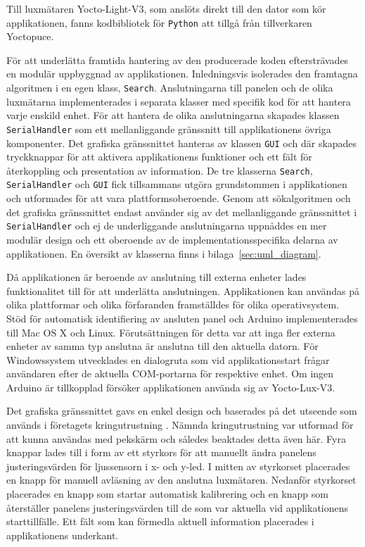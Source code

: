             Till luxmätaren Yocto-Light-V3, som anslöts direkt till den dator som kör applikationen, fanns kodbibliotek för \texttt{Python} att tillgå från tillverkaren Yoctopuce. \bigskip

            För att underlätta framtida hantering av den producerade koden eftersträvades en modulär uppbyggnad av applikationen. Inledningsvis isolerades den framtagna algoritmen i en egen klass, \texttt{Search}. Anslutningarna till panelen och de olika luxmätarna implementerades i separata klasser med specifik kod för att hantera varje enskild enhet. För att hantera de olika anslutningarna skapades klassen \texttt{SerialHandler} som ett mellanliggande gränssnitt till applikationens övriga komponenter. Det grafiska gränssnittet hanteras av klassen \texttt{GUI} och där skapades tryckknappar för att aktivera applikationens funktioner och ett fält för återkoppling och presentation av information. De tre klasserna \texttt{Search}, \texttt{SerialHandler} och \texttt{GUI} fick tillsammans utgöra grundstommen i applikationen och utformades för att vara plattformsoberoende. Genom att sökalgoritmen och det grafiska gränssnittet endast använder sig av det mellanliggande gränssnittet i \texttt{SerialHandler} och ej de underliggande anslutningarna uppnåddes en mer modulär design och ett oberoende av de implementationsspecifika delarna av applikationen. En översikt av klasserna finns i bilaga~\ref{sec:uml_diagram}. \bigskip

            Då applikationen är beroende av anslutning till externa enheter lades funktionalitet till för att underlätta anslutningen. Applikationen kan användas på olika plattformar och olika förfaranden framställdes för olika operativsystem. Stöd för automatisk identifiering av ansluten panel och Arduino implementerades till Mac OS X och Linux. Förutsättningen för detta var att inga fler externa enheter av samma typ anslutna är anslutna till den aktuella datorn. För Windowssystem utvecklades en dialogruta som vid applikationsstart frågar användaren efter de aktuella COM-portarna för respektive enhet. Om ingen Arduino är tillkopplad försöker applikationen använda sig av Yocto-Lux-V3. \bigskip

            Det grafiska gränssnittet gavs en enkel design och baserades på det utseende som används i företagets kringutrustning \cite{solarremote}. Nämnda kringutrustning var utformad för att kunna användas med pekskärm och således beaktades detta även här. Fyra knappar lades till i form av ett styrkors för att manuellt ändra panelens justeringsvärden för ljussensorn i x- och y-led. I mitten av styrkorset placerades en knapp för manuell avläsning av den anslutna luxmätaren. Nedanför styrkorset placerades en knapp som startar automatisk kalibrering och en knapp som återställer panelens justeringsvärden till de som var aktuella vid applikationens starttillfälle. Ett fält som kan förmedla aktuell information placerades i applikationens underkant.

